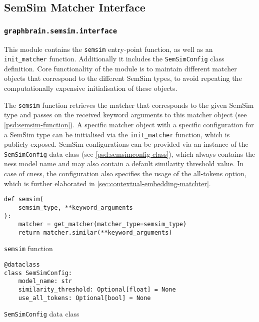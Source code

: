\documentclass[11pt]{scrreprt}
\begin{document}
{\subsection{SemSim Matcher Interface}

\subsubsection{\texttt{graphbrain.semsim.interface}}
\label{sec:graphbrain.semsim.interface}
\label{sec:ness-config}
This module contains the \texttt{semsim} entry-point function, as well as an \texttt{init\_matcher} function. Additionally it includes the 
\texttt{SemSimConfig} class definition. Core functionality of the module is to maintain different matcher objects that correspond to the different SemSim types, to avoid repeating the computationally expensive initialisation of these objects.

The \texttt{semsim} function retrieves the matcher that corresponds to the given SemSim type and passes on the received keyword arguments to this matcher object (see \cref{psd:semsim-function}). A specific matcher object with a specific configuration for a SemSim type can be initialised via the \texttt{init\_matcher} function, which is publicly exposed. 
SemSim configurations can be provided via an instance of the \texttt{SemSimConfig} data class (see \cref{psd:semsimconfig-class}), which always contains the \gls{ness} model name and may also contain a default similarity threshold value. In case of \gls{cness}, the configuration also specifies the usage of the all-tokens option, which is further elaborated in \cref{sec:contextual-embedding-matchter}.

\begin{pseudo}
\begin{lstlisting}
def semsim(
    semsim_type, **keyword_arguments
):
    matcher = get_matcher(matcher_type=semsim_type)
    return matcher.similar(**keyword_arguments)
\end{lstlisting}
\caption{\texttt{semsim} function}
\label{psd:semsim-function}
\end{pseudo}

\begin{pseudo}
\begin{lstlisting}
@dataclass
class SemSimConfig:
    model_name: str
    similarity_threshold: Optional[float] = None
    use_all_tokens: Optional[bool] = None
\end{lstlisting}
\caption{\texttt{SemSimConfig} data class}
\label{psd:semsimconfig-class}
\end{pseudo}


}
\end{document}
